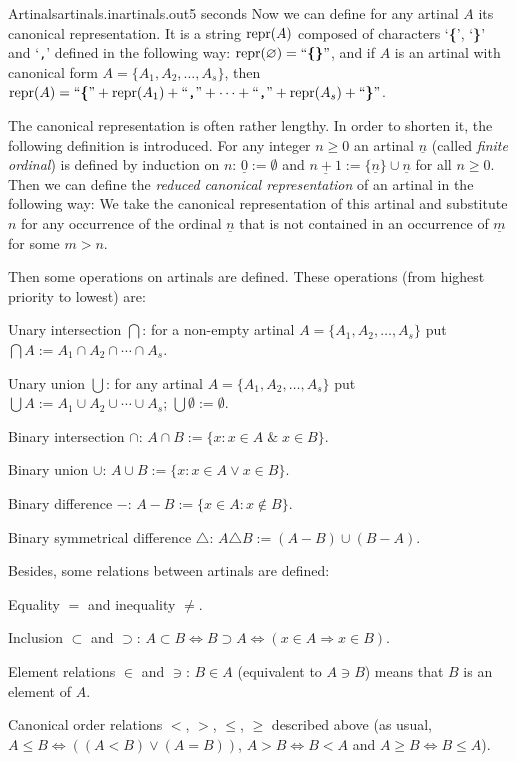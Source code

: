 \begin{problem}{Artinals}{artinals.in}{artinals.out}{5 seconds}
Now we can define for any artinal $A$ its canonical representation. 
It is a string $\mathop{\textrm{repr}}(A)$ composed of characters `{\bf \{}', `{\bf \}}' 
and `{\tt,}' defined in the following way: $\mathop{\textrm{repr}}(\varnothing)=\text{``{\bf \{\}}''}$, 
and if $A$ is an artinal with canonical form 
$A=\bigl\{A_1,A_2,\ldots,A_s\bigr\}$, then 
$\mathop{\textrm{repr}}(A)=\text{``{\bf \{}''}+\mathop{\textrm{repr}}(A_1)+\text{``{\tt ,}''}+\cdots+\text{``{\tt ,}''}+\mathop{\textrm{repr}}(A_s)+\text{``{\bf \}}''}$.

The canonical representation is often rather lengthy. In order to shorten it, 
the following definition is introduced. For any integer $n\geq0$ 
an artinal $\underline n$ (called {\em finite ordinal}) is defined by induction
on $n$: $\underline 0:=\emptyset$ and 
$\underline{n+1}:=\{\underline n\}\cup\underline{n}$ for all $n\geq0$. 
Then we can define the {\em reduced canonical representation} 
of an artinal in the following way: We take the canonical representation 
of this artinal and substitute $n$ for any occurrence of the ordinal $\underline n$ 
that is not contained in an occurrence of $\underline m$ for some $m>n$.

Then some operations on artinals are defined. These operations 
(from highest priority to lowest) are:

\begin{shortitems}
\item Unary intersection $\bigcap$: for a non-empty artinal 
$A=\bigl\{A_1,A_2,\ldots,A_s\bigr\}$ put 
$\bigcap A:=A_1\cap A_2\cap\cdots\cap A_s$.
\item Unary union $\bigcup$: for any artinal 
$A=\bigl\{A_1,A_2,\ldots,A_s\bigr\}$ put 
$\bigcup A:=A_1\cup A_2\cup\cdots\cup A_s$; $\bigcup\emptyset:=\emptyset$.
\item Binary intersection $\cap$: $A\cap B:=\{x:x\in A\;\&\;x\in B\}$.
\item Binary union $\cup$: $A\cup B:=\{x:x\in A\vee x\in B\}$.
\item Binary difference $-$: $A-B:=\{x\in A: x\nin B\}$.
\item Binary symmetrical difference $\triangle$: $A\triangle B:=(A-B)\cup(B-A)$.
\end{shortitems}

Besides, some relations between artinals are defined:
\begin{shortitems}
\item Equality $=$ and inequality $\neq$.
\item Inclusion $\subset$ and $\supset$: $A\subset B\iff
B\supset A\iff (x\in A\Rightarrow x\in B)$.
\item Element relations $\in$ and $\ni$: $B\in A$ (equivalent to $A\ni B$) 
means that $B$ is an element of $A$.
\item Canonical order relations $<$, $>$, $\leq$, $\geq$ described above 
(as usual, $A\leq B\iff((A<B)\vee(A=B))$, $A>B\iff B<A$ and 
$A\geq B\iff B\leq A$).
\end{shortitems}


\end{problem}
